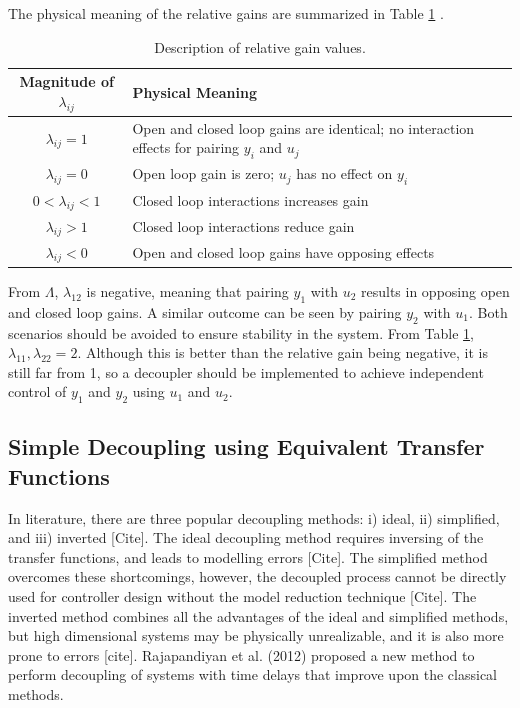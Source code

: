 The physical meaning of the relative gains are summarized in Table \ref{tab: relative_gains} \cite{process_control_design_sim}.
\begin{table}[h]
    \centering
    {
    \begin{tabular}{ c | p{12cm} }
        Magnitude of $\lambda_{ij}$  & Physical Meaning \\
        \hline
        $\lambda_{ij} = 1$ & Open and closed loop gains are identical; no interaction effects for pairing $y_i$ and $u_j$ \\
        $\lambda_{ij} = 0$ & Open loop gain is zero; $u_j$ has no effect on $y_i$ \\
        $ 0 < \lambda_{ij} < 1$ & Closed loop interactions increases gain \\
        $\lambda_{ij} > 1$ &  Closed loop interactions reduce gain \\
        $\lambda_{ij} < 0$ & Open and closed loop gains have opposing effects \\
    \end{tabular}}
    \caption{Description of relative gain values.}
    \label{tab: relative_gains}
\end{table}

From $\Lambda$, $\lambda_{12}$ is negative, meaning that pairing $y_1$ with $u_2$ results in opposing open and closed loop gains.  A similar outcome can be seen by pairing $y_2$ with $u_1$.  Both scenarios should be avoided to ensure stability in the system. From Table \ref{tab: relative_gains}, $\lambda_{11}, \lambda_{22} = 2$.  Although this is better than the relative gain being negative, it is still far from 1, so a decoupler should be implemented to achieve independent control of $y_1$ and $y_2$ using $u_1$ and $u_2$.

\subsection{Simple Decoupling using Equivalent Transfer Functions}
In literature, there are three popular decoupling methods: i) ideal, ii) simplified, and iii) inverted [Cite].  The ideal decoupling method requires inversing of the transfer functions, and leads to modelling errors [Cite].  The simplified method overcomes these shortcomings, however, the decoupled process cannot be directly used for controller design without the model reduction technique [Cite].  The inverted method combines all the advantages of the ideal and simplified methods, but high dimensional systems may be physically unrealizable, and it is also more prone to errors [cite].  Rajapandiyan et al. (2012) proposed a new method to perform decoupling of systems with time delays that improve upon the classical methods.  

